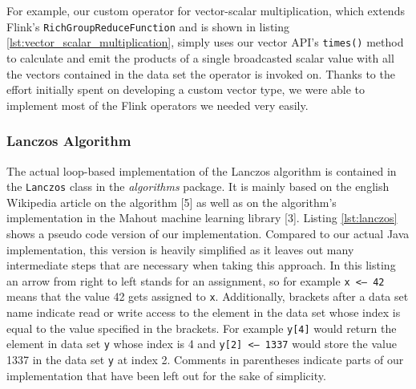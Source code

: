 For example, our custom operator for vector-scalar multiplication, which
extends Flink's \texttt{RichGroupReduceFunction} and is shown in listing
\ref{lst:vector_scalar_multiplication}, simply uses our vector API's
\texttt{times()} method to calculate and emit the products of a single
broadcasted scalar value with all the vectors contained in the data set the
operator is invoked on. Thanks to the effort initially spent on developing a
custom vector type, we were able to implement most of the Flink operators we
needed very easily.


\subsubsection{Lanczos Algorithm}

The actual loop-based implementation of the Lanczos algorithm is contained in
the \texttt{Lanczos} class in the \textit{algorithms} package. It is mainly
based on the english Wikipedia article on the algorithm [5] as well as on the
algorithm's implementation in the Mahout machine learning library [3]. Listing
\ref{lst:lanczos} shows a pseudo code version of our implementation. Compared
to our actual Java implementation, this version is heavily simplified as it
leaves out many intermediate steps that are necessary when taking this
approach. In this listing an arrow from right to left stands for an assignment,
so for example \texttt{x <-- 42} means that the value 42 gets assigned to
\texttt{x}. Additionally, brackets after a data set name indicate read or write
access to the element in the data set whose index is equal to the value
specified in the brackets. For example \texttt{y[4]} would return the element
in data set \texttt{y} whose index is 4 and \texttt{y[2] <-- 1337} would store
the value 1337 in the data set \texttt{y} at index 2. Comments in parentheses
indicate parts of our implementation that have been left out for the sake of
simplicity.

